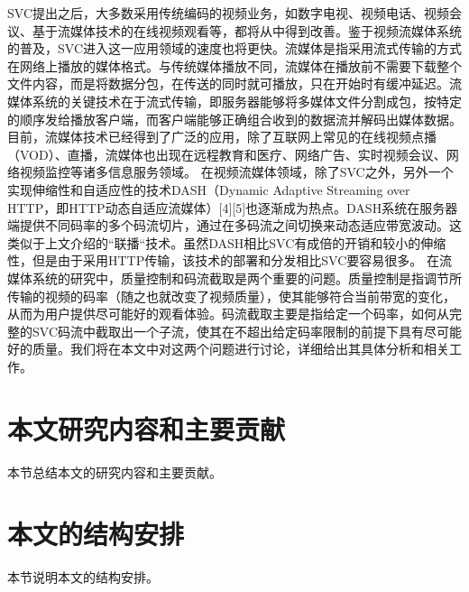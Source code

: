 SVC提出之后，大多数采用传统编码的视频业务，如数字电视、视频电话、视频会议、基于流媒体技术的在线视频观看等，都将从中得到改善。鉴于视频流媒体系统的普及，SVC进入这一应用领域的速度也将更快。流媒体是指采用流式传输的方式在网络上播放的媒体格式。与传统媒体播放不同，流媒体在播放前不需要下载整个文件内容，而是将数据分包，在传送的同时就可播放，只在开始时有缓冲延迟。流媒体系统的关键技术在于流式传输，即服务器能够将多媒体文件分割成包，按特定的顺序发给播放客户端，而客户端能够正确组合收到的数据流并解码出媒体数据。目前，流媒体技术已经得到了广泛的应用，除了互联网上常见的在线视频点播（VOD）、直播，流媒体也出现在远程教育和医疗、网络广告、实时视频会议、网络视频监控等诸多信息服务领域。
在视频流媒体领域，除了SVC之外，另外一个实现伸缩性和自适应性的技术DASH（Dynamic Adaptive Streaming over HTTP，即HTTP动态自适应流媒体）[4][5]也逐渐成为热点。DASH系统在服务器端提供不同码率的多个码流切片，通过在多码流之间切换来动态适应带宽波动。这类似于上文介绍的“联播“技术。虽然DASH相比SVC有成倍的开销和较小的伸缩性，但是由于采用HTTP传输，该技术的部署和分发相比SVC要容易很多。
在流媒体系统的研究中，质量控制和码流截取是两个重要的问题。质量控制是指调节所传输的视频的码率（随之也就改变了视频质量），使其能够符合当前带宽的变化，从而为用户提供尽可能好的观看体验。码流截取主要是指给定一个码率，如何从完整的SVC码流中截取出一个子流，使其在不超出给定码率限制的前提下具有尽可能好的质量。我们将在本文中对这两个问题进行讨论，详细给出其具体分析和相关工作。

\section{本文研究内容和主要贡献}
本节总结本文的研究内容和主要贡献。

\section{本文的结构安排}
本节说明本文的结构安排。